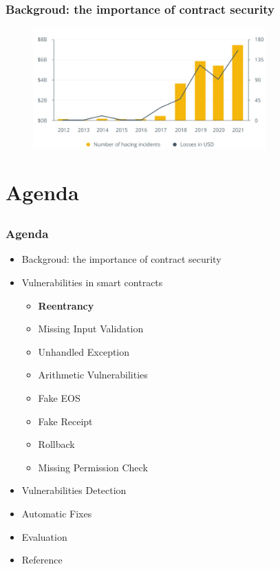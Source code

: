 \documentclass[notheorems, aspectratio=54]{beamer}
\begin{document}
\subsection{}
\begin{frame}
    \frametitle{Backgroud: the importance of contract security}

    \begin{figure}[h]
        \centering
        \includegraphics[width=0.8\textwidth]{figures/hack.png}
    \end{figure}
    
\end{frame}


\section{Agenda}
\subsection{}
\begin{frame}
    \frametitle{Agenda}

    \begin{itemize}
        \item Backgroud: the importance of contract security
        \item Vulnerabilities in smart contracts
        \begin{itemize}
            \item \textbf{Reentrancy}
            \item Missing Input Validation
            \item Unhandled Exception
            \item Arithmetic Vulnerabilities
            \item Fake EOS
            \item Fake Receipt
            \item Rollback
            \item Missing Permission Check
        \end{itemize}
        \item Vulnerabilities Detection
        \item Automatic Fixes
        \item Evaluation
        \item Reference
    \end{itemize}
    
\end{frame}
\end{document}
